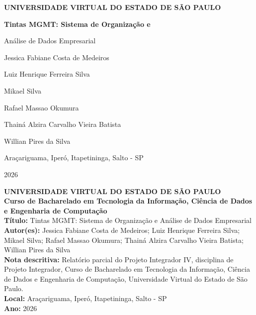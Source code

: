 \documentclass[12pt,a4paper]{article}
\begin{document}
\setcounter{page}{1}


\begin{titlepage}
\centering
\vspace*{2cm}
{\Large\bfseries UNIVERSIDADE VIRTUAL DO ESTADO DE SÃO PAULO\par}
\vspace{2cm}
{\huge\bfseries Tintas MGMT: Sistema de Organização e\par}
\vspace{0.3cm}
{\large Análise de Dados Empresarial\par}
\vspace{3.5cm}
{\normalsize Jessica Fabiane Costa de Medeiros\par}
{\normalsize Luiz Henrique Ferreira Silva\par}
{\normalsize Mikael Silva\par}
{\normalsize Rafael Massao Okumura\par}
{\normalsize Thainá Alzira Carvalho Vieira Batista\par}
{\normalsize Willian Pires da Silva\par}
\vfill
{\normalsize Araçariguama, Iperó, Itapetininga, Salto - SP\par}
{\normalsize 2026\par}
\end{titlepage}
\pagestyle{empty}

\pagebreak
\thispagestyle{empty}
\begin{center}
\textbf{UNIVERSIDADE VIRTUAL DO ESTADO DE SÃO PAULO}\\[0.8cm]
\textbf{Curso de Bacharelado em Tecnologia da Informação, Ciência de Dados e Engenharia de Computação}\\[1.2cm]
\textbf{Título:} Tintas MGMT: Sistema de Organização e Análise de Dados Empresarial\\[0.8cm]
\textbf{Autor(es):} Jessica Fabiane Costa de Medeiros; Luiz Henrique Ferreira Silva; Mikael Silva; Rafael Massao Okumura; Thainá Alzira Carvalho Vieira Batista; Willian Pires da Silva\\[0.8cm]
\textbf{Nota descritiva:} Relatório parcial do Projeto Integrador IV, disciplina de Projeto Integrador, Curso de Bacharelado em Tecnologia da Informação, Ciência de Dados e Engenharia de Computação, Universidade Virtual do Estado de São Paulo.\\[1.2cm]
\textbf{Local:} Araçariguama, Iperó, Itapetininga, Salto - SP\\[0.4cm]
\textbf{Ano:} 2026
\end{center}
\pagebreak
\end{document}
